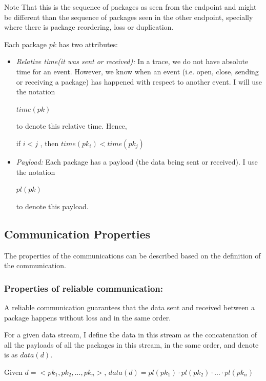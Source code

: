 Note That this is the sequence of packages as seen from the endpoint and might be different than the sequence of packages seen in the other endpoint, specially where there is package reordering, loss or duplication.

Each package $pk$ has two attributes:
\begin{itemize}
\item \textit{Relative time(it was sent or received):} In a trace, we do not have absolute time for an event. However, we know when an event (i.e. open, close, sending or receiving a package) has happened with respect to another event. I will use the notation 

$time(pk)$

to denote this relative time. Hence, 

if  $i < j $ , then  $time(pk_i) < time(pk_j)$

\item \textit{Payload:} Each package has a payload (the data being sent or received). I use the notation 

$pl(pk)$ 

to denote this payload. 

\end{itemize}


\subsection{Communication Properties}\label{properties}
The properties of the communications can be described based on the definition of the communication.

\subsubsection{Properties of reliable communication:}\label{reliablepro}
A reliable communication guarantees that the data sent and received between a package happens without loss and in the same order.

For a given data stream, I define the data in this stream as the concatenation of all the payloads of all the packages in this stream, in the same order, and denote is as $data(d)$.

Given $ d = <pk_1, pk_2, ..., pk_n>$, $data(d) = pl(pk_1) \cdot pl(pk_2)\cdot \ldots \cdot pl(pk_n)$

